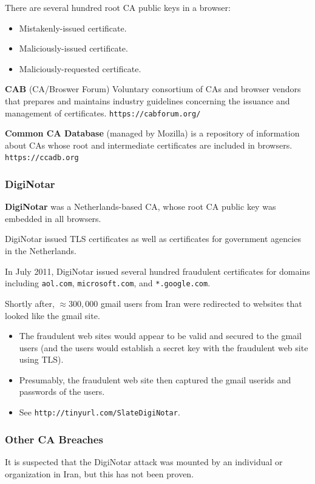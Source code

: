 \documentclass[12pt,titlepage]{article}
\begin{document}
There are several hundred root CA public keys in a browser: \begin{itemize}
	\item Mistakenly-issued certificate. 
	\item Maliciously-issued certificate. 
	\item Maliciously-requested certificate.
\end{itemize}

\textbf{CAB} (CA/Broswer Forum) Voluntary consortium of CAs and browser vendors that prepares and maintains industry guidelines concerning the issuance and management of certificates. \texttt{https://cabforum.org/}

\textbf{Common CA Database} (managed by Mozilla) is a repository of information about CAs whose root and intermediate certificates are included in browsers. \texttt{https://ccadb.org}
\subsubsection{DigiNotar}
\textbf{DigiNotar} was a Netherlands-based CA, whose root CA public key was embedded in all browsers.

DigiNotar issued TLS certificates as well as certificates for government agencies in the Netherlands.

In July 2011, DigiNotar issued several hundred fraudulent certificates for domains including \texttt{aol.com}, \texttt{microsoft.com}, and \texttt{*.google.com}.

Shortly after, $\approx300,000$ gmail users from Iran were redirected to websites that looked like the gmail site. \begin{itemize}
	\item The fraudulent web sites would appear to be valid and secured to the gmail users (and the users would establish a secret key with the fraudulent web site using TLS).
	\item Presumably, the fraudulent web site then captured the gmail userids and passwords of the users.
	\item See \texttt{http://tinyurl.com/SlateDigiNotar}.
\end{itemize}
\subsubsection{Other CA Breaches}
It is suspected that the DigiNotar attack was mounted by an individual or organization in Iran, but this has not been proven.
\end{document}
